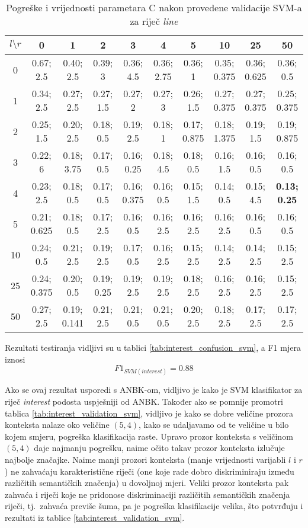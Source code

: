 \documentclass[10pt, a4paper]{article}
\begin{document}
\begin{table*}[!hbtp]
\caption{Pogreške i vrijednosti parametara C nakon provedene validacije SVM-a za riječ \emph{line}}
\label{tab:line_validation_svm}
\begin{center}
\begin{tabular}{|c|ccccccccc|}
\hline
$l \setminus r$ & 0 & 1 & 2 & 3 & 4 & 5 & 10 & 25 & 50 \\
\hline
0 & 0.67; 2.5 & 0.40; 2.5 & 0.39; 3 & 0.36; 4.5 & 0.36; 2.75 & 0.36; 1 & 0.35; 0.375 & 0.36; 0.625 & 0.36; 0.5 \\
1 & 0.34; 2.5 & 0.27; 2.5 & 0.27; 1.5 & 0.27; 2 & 0.27; 3 & 0.26; 1.5 & 0.27; 0.375 & 0.27; 0.375 & 0.25; 0.375 \\
2 & 0.25; 1.5 & 0.20; 2.5 & 0.18; 0.5 & 0.19; 2.5 & 0.18; 1 & 0.17; 0.875 & 0.18; 1.375 & 0.19; 1.5 & 0.19; 0.875 \\
3 & 0.22; 6 & 0.18; 3.75 & 0.17; 0.5 & 0.16; 0.25 & 0.18; 4.5 & 0.18; 0.5 & 0.16; 1.5 & 0.16; 0.5 & 0.16; 0.5 \\
4 & 0.23; 2.5 & 0.18; 0.5 & 0.17; 0.5 & 0.16; 0.375 & 0.16; 0.5 & 0.15; 1.5 & 0.14; 0.5 & 0.15; 4.5 & \textbf{0.13; 0.25} \\
5 & 0.21; 0.625 & 0.18; 0.5 & 0.17; 2.5 & 0.16; 0.5 & 0.16; 2.5 & 0.16; 2.5 & 0.16; 2.5 & 0.16; 0.5 & 0.16; 0.5 \\
10 & 0.24; 0.5 & 0.21; 2.5 & 0.19; 2.5 & 0.17; 0.5 & 0.16; 2.5 & 0.15; 2.5 & 0.14; 2.5 & 0.14; 2.5 & 0.15; 2.5 \\
25 & 0.24; 0.375 & 0.20; 0.5 & 0.19; 0.25 & 0.19; 2.5 & 0.19; 2.5 & 0.18; 2.5 & 0.16; 2.5 & 0.16; 2.5 & 0.15; 2.5 \\
50 & 0.27; 2.5 & 0.19; 0.141 & 0.21; 2.5 & 0.21; 0.5 & 0.21; 0.5 & 0.20; 2.5 & 0.18; 2.5 & 0.17; 2.5 & 0.17; 2.5 \\
\hline
\end{tabular}
\end{center}
\end{table*}
Rezultati testiranja vidljivi su u tablici \ref{tab:interest_confusion_svm},
a F1 mjera iznosi
\begin{equation}
\label{eq:f1_svm_interest}
F1_{SVM(interest)} = 0.88
\end{equation}

Ako se ovaj rezultat usporedi s ANBK-om, vidljivo je kako je SVM klasifikator za riječ \emph{interest} podosta uspješniji od ANBK.
Također ako se pomnije promotri tablica \ref{tab:interest_validation_svm}, vidljivo je kako se dobre veličine
prozora konteksta nalaze oko veličine $(5,4)$, 
kako se udaljavamo od te veličine u bilo kojem smjeru, pogreška klasifikacija raste.
Upravo prozor konteksta s veličinom $(5, 4)$ daje najmanju pogrešku,
naime očito takav prozor konteksta izlučuje najbolje značajke.
Naime manji prozori konteksta (manje vrijednosti varijabli $l$ i $r$) 
ne zahvaćaju karakteristične riječi (one koje rade dobro diskriminiraju između različitih semantičkih značenja) u dovoljnoj mjeri.
Veliki prozor konteksta pak zahvaća i riječi koje ne pridonose diskriminaciji
različitih semantičkih značenja riječi, tj.~zahvaća previše šuma, pa je
pogreška klasifikacije velika, što potvrđuju i rezultati iz tablice \ref{tab:interest_validation_svm}.
\end{document}
